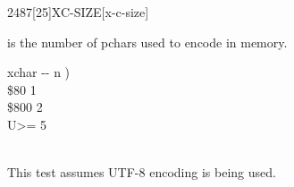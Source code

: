 \vspace*{-1ex}
\begin{worddef}{2487}[25]{XC-SIZE}[x-c-size]%
\item {}

	 is the number of pchars used to encode  in memory.

	\begin{implement} %
	\word{:}   xchar -{}- n ) \\
	\tab {} \$80    1     \\
	\tab \$800  2  \\
	\tab {}  U>=   5         \\
	\tab {}  \\
	\word{;}
	\end{implement}

	\begin{testing} %
		This test assumes UTF-8 encoding is being used.

		\ttfamily
		 \\
		 \\
		 \\
		 \\
		 \\
		 \\
		 \\
		 \\
  \end{testing}
\end{worddef}

